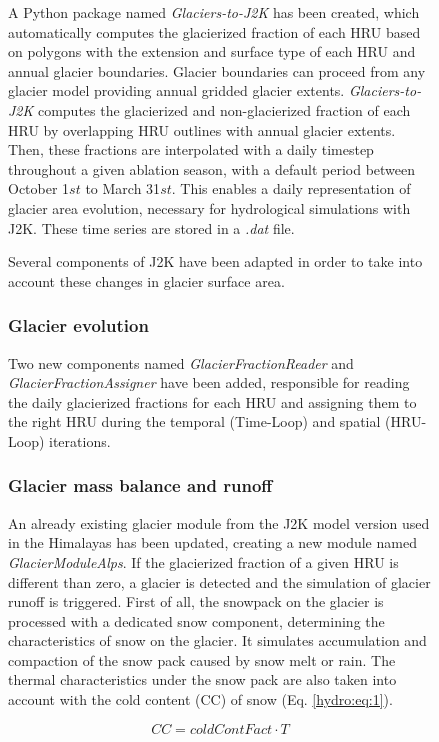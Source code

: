 \begin{figure}[h]
A Python package named \textit{Glaciers-to-J2K} has been created, which automatically computes the glacierized fraction of each HRU based on polygons with the extension and surface type of each HRU and annual glacier boundaries. Glacier boundaries can proceed from any glacier model providing annual gridded glacier extents. \textit{Glaciers-to-J2K} computes the glacierized and non-glacierized fraction of each HRU by overlapping HRU outlines with annual glacier extents. Then, these fractions are interpolated with a daily timestep throughout a given ablation season, with a default period between October 1${st}$ to March 31${st}$. This enables a daily representation of glacier area evolution, necessary for hydrological simulations with J2K. These time series are stored in a \textit{.dat} file.

Several components of J2K have been adapted in order to take into account these changes in glacier surface area. 

\subsubsection{Glacier evolution}

Two new components named \textit{GlacierFractionReader} and \textit{GlacierFractionAssigner} have been added, responsible for reading the daily glacierized fractions for each HRU and assigning them to the right HRU during the temporal (Time-Loop) and spatial (HRU-Loop) iterations. 

\subsubsection{Glacier mass balance and runoff}

An already existing glacier module from the J2K model version used in the Himalayas has been updated, creating a new module named \textit{GlacierModuleAlps}. If the glacierized fraction of a given HRU is different than zero, a glacier is detected and the simulation of glacier runoff is triggered. First of all, the snowpack on the glacier is processed with a dedicated snow component, determining the characteristics of snow on the glacier. It simulates accumulation and compaction of the snow pack caused by snow melt or rain. The thermal characteristics under the snow pack are also taken into account with the cold content (CC) of snow (Eq. \ref{hydro:eq:1}).

\begin{equation} \label{hydro:eq:1}
 CC = coldContFact \cdot T
 \end{equation} 
 

\end{figure}
